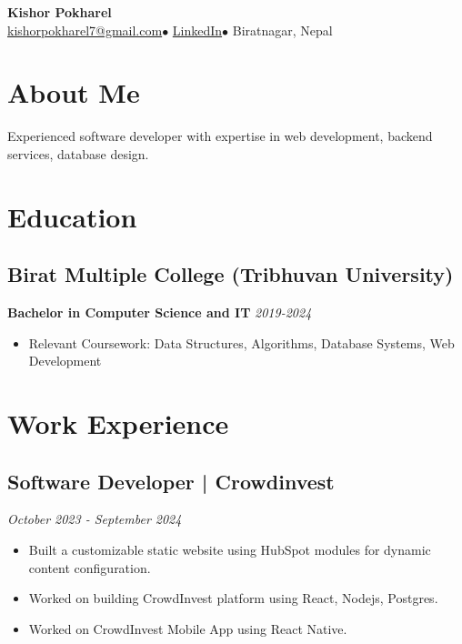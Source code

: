 \documentclass[11pt,a4paper]{article}
\begin{document}
\begin{center}
    {\LARGE \textbf{Kishor Pokharel}}\\
    \vspace{0.25em}
    \href{mailto:kishorpokharel7@gmail.com}{kishorpokharel7@gmail.com}$\bullet$
    \href{https://www.linkedin.com/in/kishor-pokharel-7192951b0}{LinkedIn}$\bullet$
    Biratnagar, Nepal
\end{center}


\section*{About Me}
Experienced software developer with expertise in web development, backend services, database design.

\section*{Education}
\subsection*{Birat Multiple College (Tribhuvan University)}
\textbf{Bachelor in Computer Science and IT} \hfill \textit{2019-2024}
\begin{itemize}[leftmargin=*, noitemsep]
    \item Relevant Coursework: Data Structures, Algorithms, Database Systems, Web Development
\end{itemize}

\section*{Work Experience}

\subsection*{Software Developer | Crowdinvest} \hfill \textit{October 2023 - September 2024}
\begin{itemize}[leftmargin=*, noitemsep]
    \item Built a customizable static website using HubSpot modules for dynamic content configuration.
    \item Worked on building CrowdInvest platform using React, Nodejs, Postgres.
    \item Worked on CrowdInvest Mobile App using React Native.
\end{itemize}
\end{document}

